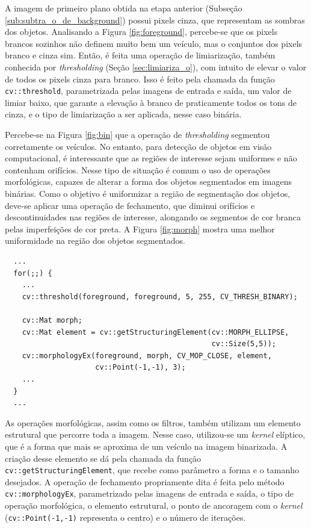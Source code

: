 A imagem de primeiro plano obtida na etapa anterior (Subseção \ref{sub:subtra_o_de_background}) possui pixels cinza, que representam as sombras dos objetos. Analisando a Figura \ref{fig:foreground}, percebe-se que os pixels brancos sozinhos não definem muito bem um veículo, mas o conjuntos dos pixels branco e cinza sim. Então, é feita uma operação de limiarização, também conhecida por \textit{thresholding} (Seção \ref{sec:limiariza_o}), com intuito de elevar o valor de todos os pixels cinza para branco. Isso é feito pela chamada da função \verb! cv::threshold!, parametrizada pelas imagens de entrada e saída, um valor de limiar baixo, que garante a elevação à branco de praticamente todos os tons de cinza, e o tipo de limiarização a ser aplicada, nesse caso binária. 

Percebe-se na Figura \ref{fig:bin} que a operação de \textit{thresholding} segmentou corretamente os veículos. No entanto, para detecção de objetos em visão computacional, é interessante que as regiões de interesse sejam uniformes e não contenham orifícios. Nesse tipo de situação é comum o uso de operações morfológicas, capazes de alterar a forma dos objetos segmentados em imagens binárias. Como o objetivo é uniformizar a região de segmentação dos objetos, deve-se aplicar uma operação de fechamento, que diminui orifícios e descontinuidades nas regiões de interesse, alongando os segmentos de cor branca pelas imperfeições de cor preta. A Figura \ref{fig:morph} mostra uma melhor uniformidade na região dos objetos segmentados.

\begin{lstlisting}
  ...
  for(;;) {
    ...
    cv::threshold(foreground, foreground, 5, 255, CV_THRESH_BINARY);

    cv::Mat morph;
    cv::Mat element = cv::getStructuringElement(cv::MORPH_ELLIPSE,
                                                cv::Size(5,5));
    cv::morphologyEx(foreground, morph, CV_MOP_CLOSE, element, 
                     cv::Point(-1,-1), 3);
    ...
  }
  ...  
\end{lstlisting}

As operações morfológicas, assim como os filtros, também utilizam um elemento estrutural que percorre toda a imagem. Nesse caso, utilizou-se um \textit{kernel} elíptico, que é a forma que mais se aproxima de um veículo na imagem binarizada. A criação desse elemento se dá pela chamada da função \verb!cv::getStructuringElement!, que recebe como parâmetro a forma e o tamanho desejados. A operação de fechamento propriamente dita é feita pelo método \verb!cv::morphologyEx!, parametrizado pelas imagens de entrada e saída, o tipo de operação morfológica, o elemento estrutural, o ponto de ancoragem com o \textit{kernel} (\verb!cv::Point(-1,-1)!  representa o centro) e o número de iterações.

